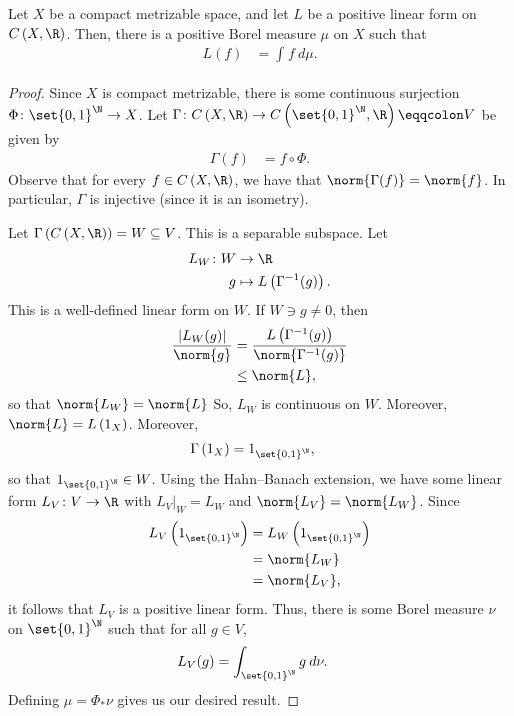 \documentclass[10pt]{mypackage}
\renewcommand{\eqcolon}{\eqqcolon}
\begin{document}
\begin{theorem}
  Let $X$ be a compact metrizable space, and let $L$ be a positive linear form on $C\left( X,\R \right)$. Then, there is a positive Borel measure $\mu$ on $X$ such that
  \begin{align*}
    L(f) &= \int_{}^{} f\:d\mu.
  \end{align*}
\end{theorem}
\begin{proof}
  Since $X$ is compact metrizable, there is some continuous surjection $\Phi\colon \set{0,1}^{\N}\to X$. Let $\Gamma\colon C\left( X,\R \right)\to C\left( \set{0,1}^{\N},\R \right)\eqcolon V$ be given by
  \begin{align*}
    \Gamma(f) &= f\circ \Phi.
  \end{align*}
  Observe that for every $f\in C\left( X,\R \right)$, we have that $\norm{\Gamma(f)} = \norm{f}$. In particular, $\Gamma$ is injective (since it is an isometry).

  Let $\Gamma\left( C\left( X,\R \right) \right)= W\subseteq V$. This is a separable subspace. Let
  \begin{align*}
    L_W\colon W &\to \R\\
    g &\mapsto L\left( \Gamma^{-1}(g) \right).
  \end{align*}
  This is a well-defined linear form on $W$. If $W\ni g\neq 0$, then
  \begin{align*}
    \frac{\left\vert L_W(g) \right\vert}{\norm{g}} &= \frac{L\left( \Gamma^{-1}(g) \right)}{\norm{\Gamma^{-1}(g)}}\\
                                                   &\leq \norm{L},
  \end{align*}
  so that $\norm{L_W} = \norm{L}$ So, $L_W$ is continuous on $W$. Moreover, $\norm{L} = L\left( 1_X \right)$. Moreover,
  \begin{align*}
    \Gamma\left( 1_{X} \right) &= 1_{\set{0,1}^{\N}},
  \end{align*}
  so that $1_{\set{0,1}^{\N}}\in W$. Using the Hahn--Banach extension, we have some linear form $L_V\colon V\to \R$ with $L_V|_{W} = L_W$ and $\norm{L_V} = \norm{L_W}$. Since 
  \begin{align*}
    L_V\left( 1_{\set{0,1}^{\N}} \right) &= L_W\left( 1_{\set{0,1}^{\N}} \right)\\
                                            &= \norm{L_W}\\
                                            &= \norm{L_V},
  \end{align*}
  it follows that $L_V$ is a positive linear form. Thus, there is some Borel measure $\nu$ on $\set{0,1}^{\N}$ such that for all $g\in V$,
  \begin{align*}
    L_V(g) &= \int_{\set{0,1}^{\N}}^{} g\:d\nu.
  \end{align*}
  Defining $\mu = \Phi_{\ast}\nu$ gives us our desired result.


\end{proof}
\end{document}
